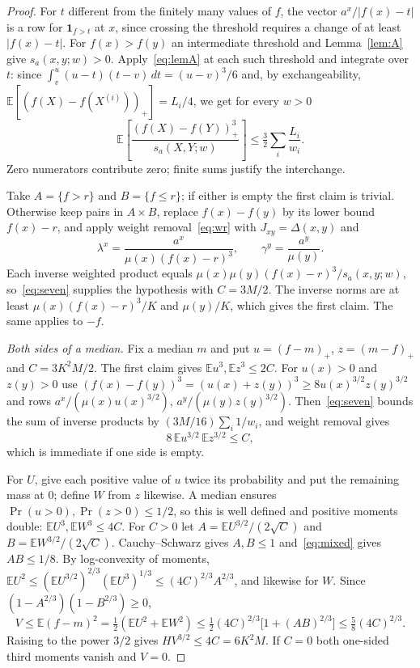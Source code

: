 \documentclass[11pt]{article}
\numberwithin{equation}{section}
\newcommand{\E}{\mathbb{E}}
\theoremstyle{plain}
\theoremstyle{remark}
\begin{document}
\begin{proof}
For $t$ different from the finitely many values of $f$, the vector $a^x/|f(x)-t|$ is a row for $\mathbf1_{f>t}$ at $x$, since crossing the threshold requires a change of at least $|f(x)-t|$. For $f(x)>f(y)$ an intermediate threshold and Lemma~\ref{lem:A} give $s_a(x,y;w)>0$. Apply~\eqref{eq:lemA} at each such threshold and integrate over $t$: since $\int_v^u(u-t)(t-v)\,dt=(u-v)^3/6$ and, by exchangeability, $\E[(f(X)-f(X^{(i)}))_+]=L_i/4$, we get for every $w>0$
\begin{equation}\label{eq:seven}
\E\left[\frac{(f(X)-f(Y))_+^3}{s_a(X,Y;w)}\right]\le\tfrac32\sum_i\frac{L_i}{w_i}.
\end{equation}
Zero numerators contribute zero; finite sums justify the interchange.

Take $A=\{f>r\}$ and $B=\{f\le r\}$; if either is empty the first claim is trivial. Otherwise keep pairs in $A\times B$, replace $f(x)-f(y)$ by its lower bound $f(x)-r$, and apply weight removal~\eqref{eq:wr} with $J_{xy}=\Delta(x,y)$ and
\[
\lambda^x=\frac{a^x}{\mu(x)(f(x)-r)^3},\qquad\gamma^y=\frac{a^y}{\mu(y)}.
\]
Each inverse weighted product equals $\mu(x)\mu(y)(f(x)-r)^3/s_a(x,y;w)$, so~\eqref{eq:seven} supplies the hypothesis with $C=3M/2$. The inverse norms are at least $\mu(x)(f(x)-r)^3/K$ and $\mu(y)/K$, which gives the first claim. The same applies to $-f$.

\emph{Both sides of a median.} Fix a median $m$ and put $u=(f-m)_+$, $z=(m-f)_+$ and $C=3K^2M/2$. The first claim gives $\E u^3,\E z^3\le2C$. For $u(x)>0$ and $z(y)>0$ use $(f(x)-f(y))^3=(u(x)+z(y))^3\ge8u(x)^{3/2}z(y)^{3/2}$ and rows $a^x/(\mu(x)u(x)^{3/2})$, $a^y/(\mu(y)z(y)^{3/2})$. Then~\eqref{eq:seven} bounds the sum of inverse products by $(3M/16)\sum_i1/w_i$, and weight removal gives
\begin{equation}\label{eq:mixed}
8\,\E u^{3/2}\,\E z^{3/2}\le C,
\end{equation}
which is immediate if one side is empty.

For $U$, give each positive value of $u$ twice its probability and put the remaining mass at $0$; define $W$ from $z$ likewise. A median ensures $\Pr(u>0),\Pr(z>0)\le1/2$, so this is well defined and positive moments double: $\E U^3,\E W^3\le4C$. For $C>0$ let $A=\E U^{3/2}/(2\sqrt C)$ and $B=\E W^{3/2}/(2\sqrt C)$. Cauchy--Schwarz gives $A,B\le1$ and~\eqref{eq:mixed} gives $AB\le1/8$. By log-convexity of moments, $\E U^2\le(\E U^{3/2})^{2/3}(\E U^3)^{1/3}\le(4C)^{2/3}A^{2/3}$, and likewise for $W$. Since $(1-A^{2/3})(1-B^{2/3})\ge0$,
\[
V\le\E(f-m)^2=\tfrac12(\E U^2+\E W^2)\le\tfrac12(4C)^{2/3}\bigl[1+(AB)^{2/3}\bigr]\le\tfrac58(4C)^{2/3}.
\]
Raising to the power $3/2$ gives $HV^{3/2}\le4C=6K^2M$. If $C=0$ both one-sided third moments vanish and $V=0$.
\end{proof}
\end{document}
